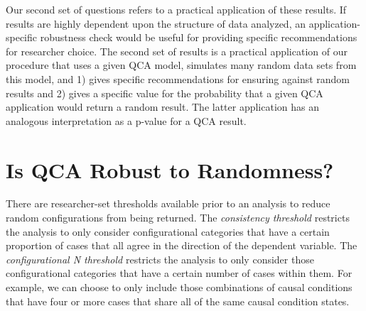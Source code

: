 \documentclass[]{article}
\begin{document}
{Our second set of questions refers to a practical application of these results. If results are highly dependent upon the structure of data analyzed, an application-specific robustness check would be useful for providing specific recommendations for researcher choice. The second set of results is a practical application of our procedure that uses a given QCA model, simulates many random data sets from this model, and 1) gives specific recommendations for ensuring against random results and 2) gives a specific value for the probability that a given QCA application would return a random result. The latter application has an analogous interpretation as a p-value for a QCA result. 






\section{Is QCA Robust to Randomness?}


There are researcher-set thresholds available prior to an analysis to reduce random configurations from being returned. The {\it{consistency threshold}} restricts the analysis to only consider configurational categories that have a certain proportion of cases that all agree in the direction of the dependent variable. The {\it{configurational N threshold}} restricts the analysis to only consider those configurational categories that have a certain number of cases within them. For example, we can choose to only include those combinations of causal conditions that have four or more cases that share all of the same causal condition states.

}
\end{document}
